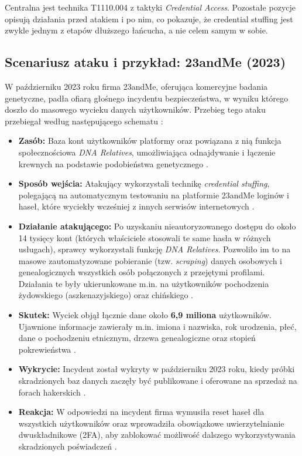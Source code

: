 \documentclass[12pt,a4paper]{article}
\begin{document}
Centralna jest technika T1110.004 z taktyki \emph{Credential Access}. Pozostałe pozycje opisują działania przed atakiem i po nim, co pokazuje, że credential stuffing jest zwykle jednym z etapów dłuższego łańcucha, a nie celem samym w sobie.

\subsection{Scenariusz ataku i przykład: 23andMe (2023)}

W październiku 2023 roku firma 23andMe, oferująca komercyjne badania genetyczne, padła ofiarą głośnego incydentu bezpieczeństwa, w wyniku którego doszło do masowego wycieku danych użytkowników. Przebieg tego ataku przebiegał według następującego schematu \cite{wiki23, sec23}:

\begin{itemize}
    \item \textbf{Zasób:} Baza kont użytkowników platformy oraz powiązana z nią funkcja społecznościowa \textit{DNA Relatives}, umożliwiająca odnajdywanie i łączenie krewnych na podstawie podobieństwa genetycznego \cite{wiki23, sec23}.
    \item \textbf{Sposób wejścia:} Atakujący wykorzystali technikę \textit{credential stuffing}, polegającą na automatycznym testowaniu na platformie 23andMe loginów i haseł, które wyciekły wcześniej z innych serwisów internetowych \cite{owasp, wiki23}.
    \item \textbf{Działanie atakującego:} Po uzyskaniu nieautoryzowanego dostępu do około 14 tysięcy kont (których właściciele stosowali te same hasła w różnych usługach), sprawcy wykorzystali funkcję \textit{DNA Relatives}. Pozwoliło im to na masowe zautomatyzowane pobieranie (tzw. \textit{scraping}) danych osobowych i genealogicznych wszystkich osób połączonych z przejętymi profilami. Działania te były ukierunkowane m.in. na użytkowników pochodzenia żydowskiego (aszkenazyjskiego) oraz chińskiego \cite{wiki23, sec23}.
    \item \textbf{Skutek:} Wyciek objął łącznie dane około \textbf{6,9 miliona} użytkowników. Ujawnione informacje zawierały m.in. imiona i nazwiska, rok urodzenia, płeć, dane o pochodzeniu etnicznym, drzewa genealogiczne oraz stopień pokrewieństwa \cite{sec23, wiki23}.
    \item \textbf{Wykrycie:} Incydent został wykryty w październiku 2023 roku, kiedy próbki skradzionych baz danych zaczęły być publikowane i oferowane na sprzedaż na forach hakerskich \cite{wiki23}.
    \item \textbf{Reakcja:} W odpowiedzi na incydent firma wymusiła reset haseł dla wszystkich użytkowników oraz wprowadziła obowiązkowe uwierzytelnianie dwuskładnikowe (2FA), aby zablokować możliwość dalszego wykorzystywania skradzionych poświadczeń \cite{wiki23}.
\end{itemize}
\end{document}
